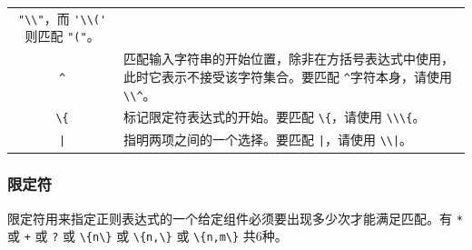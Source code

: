\documentclass[doctor,openright,twoside]{sjtuthesis}
\newcommand{\passthrough}[1]{#1}
\theoremstyle{plain}
\theoremstyle{definition}
\theoremstyle{remark}
\theoremstyle{ocrenumbox}
\theoremstyle{plain}
\begin{document}
\begin{longtable}[]{@{}cl@{}}
\begin{minipage}[t]{0.72\columnwidth}
\passthrough{\lstinline!"\\"!}，而 \passthrough{\lstinline!'\\('!}
则匹配 \passthrough{\lstinline!"("!}。\strut
\end{minipage}\tabularnewline
\begin{minipage}[t]{0.23\columnwidth}\centering
\passthrough{\lstinline!^!}\strut
\end{minipage} & \begin{minipage}[t]{0.72\columnwidth}\raggedright
匹配输入字符串的开始位置，除非在方括号表达式中使用，此时它表示不接受该字符集合。要匹配
\passthrough{\lstinline!^!}字符本身，请使用
\passthrough{\lstinline!\\^!}。\strut
\end{minipage}\tabularnewline
\begin{minipage}[t]{0.23\columnwidth}\centering
\passthrough{\lstinline!\{!}\strut
\end{minipage} & \begin{minipage}[t]{0.72\columnwidth}\raggedright
标记限定符表达式的开始。要匹配 \passthrough{\lstinline!\{!}，请使用
\passthrough{\lstinline!\\\{!}。\strut
\end{minipage}\tabularnewline
\begin{minipage}[t]{0.23\columnwidth}\centering
\passthrough{\lstinline!|!}\strut
\end{minipage} & \begin{minipage}[t]{0.72\columnwidth}\raggedright
指明两项之间的一个选择。要匹配 \passthrough{\lstinline!|!}，请使用
\passthrough{\lstinline!\\|!}。\strut
\end{minipage}\tabularnewline
\bottomrule
\end{longtable}

\subsubsection{限定符}

限定符用来指定正则表达式的一个给定组件必须要出现多少次才能满足匹配。有
\passthrough{\lstinline!*!} 或 \passthrough{\lstinline!+!} 或
\passthrough{\lstinline!?!} 或 \passthrough{\lstinline!\{n\}!} 或
\passthrough{\lstinline!\{n,\}!} 或 \passthrough{\lstinline!\{n,m\}!}
共6种。
\end{document}

